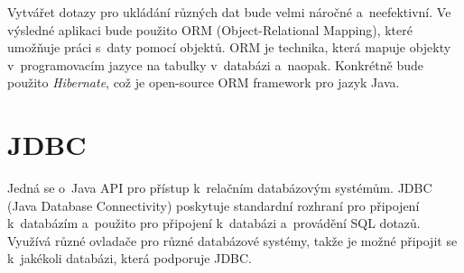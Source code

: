 Vytvářet dotazy pro ukládání různých dat bude velmi náročné a~neefektivní.
Ve výsledné aplikaci bude použito ORM (Object-Relational Mapping), které umožňuje práci s~daty pomocí objektů.
ORM je technika, která mapuje objekty v~programovacím jazyce na tabulky v~databázi a~naopak.
Konkrétně bude použito \textit{Hibernate}, což je open-source ORM framework pro jazyk Java.

\section{JDBC}
Jedná se o~Java API pro přístup k~relačním databázovým systémům.
JDBC (Java Database Connectivity) poskytuje standardní rozhraní pro 
připojení k~databázím a~použito pro připojení k~databázi a~provádění SQL dotazů.
Využívá různé ovladače pro různé databázové systémy, takže je možné připojit se k~jakékoli databázi,
která podporuje JDBC. 